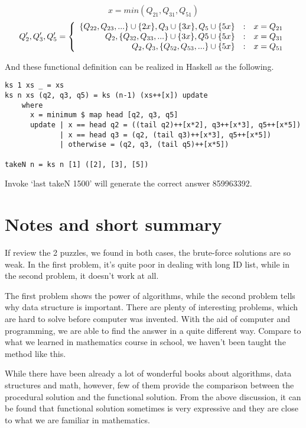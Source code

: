 \documentclass[UTF8]{article}
\begin{document}
\[
 x = min(Q_{21}, Q_{31}, Q_{51})
\]
\[
 Q_2', Q_3', Q_5' = \left \{
 \begin{array}{r@{\quad:\quad}l}
 \{Q_{22}, Q_{23}, ...\} \cup \{2x\}, Q_3 \cup \{3x\}, Q_5 \cup \{5x\} & x = Q_{21} \\
 Q_2, \{Q_{32}, Q_{33}, ...\} \cup \{3x\}, Q5 \cup \{5x\} & x = Q_{31} \\
 Q_2, Q_3, \{Q_{52}, Q_{53}, ...\} \cup \{5x\} & x = Q_{51}
 \end{array}
 \right.
\]

And these functional definition can be realized in Haskell as the following.

\lstset{language=Haskell}
\begin{lstlisting}
ks 1 xs _ = xs
ks n xs (q2, q3, q5) = ks (n-1) (xs++[x]) update
    where
      x = minimum $ map head [q2, q3, q5]
      update | x == head q2 = ((tail q2)++[x*2], q3++[x*3], q5++[x*5])
             | x == head q3 = (q2, (tail q3)++[x*3], q5++[x*5])
             | otherwise = (q2, q3, (tail q5)++[x*5])

takeN n = ks n [1] ([2], [3], [5])
\end{lstlisting} %

Invoke `last takeN 1500' will generate the correct answer 859963392.

\section{Notes and short summary}
If review the 2 puzzles, we found in both cases, the brute-force solutions
are so weak. In the first problem, it's quite poor in dealing with
long ID list, while in the second problem, it doesn't work at all.

The first problem shows the power of algorithms, while the second
problem tells why data structure is important. There are plenty
of interesting problems, which are hard to solve before computer
was invented. With the aid of computer and programming, we are able
to find the answer in a quite different way. Compare to what we
learned in mathematics course in school, we haven't been taught the method
like this.

While there have been already a lot of wonderful books about
algorithms, data structures and math, however, few of them
provide the comparison between the procedural solution and
the functional solution. From the above discussion, it can be
found that functional solution sometimes is very expressive
and they are close to what we are familiar in mathematics.
\end{document}
